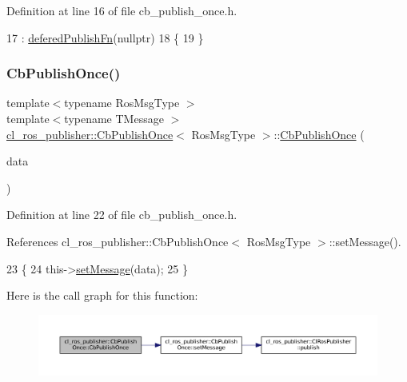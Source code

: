 Definition at line 16 of file cb\+\_\+publish\+\_\+once.\+h.


\begin{DoxyCode}
17         : \hyperlink{classcl__ros__publisher_1_1CbPublishOnce_a6222a91fb87cd3118ca9f84ff857c696}{deferedPublishFn}(\textcolor{keyword}{nullptr})
18     \{
19     \}
\end{DoxyCode}
\mbox{\label{classcl__ros__publisher_1_1CbPublishOnce_a54d9062c233e9949ec45c27da69cf83d}} 
\subsubsection{\texorpdfstring{Cb\+Publish\+Once()}{CbPublishOnce()}\hspace{0.1cm}{\footnotesize\ttfamily [2/2]}}
{\footnotesize\ttfamily template$<$typename Ros\+Msg\+Type $>$ \\
template$<$typename T\+Message $>$ \\
\hyperlink{classcl__ros__publisher_1_1CbPublishOnce}{cl\+\_\+ros\+\_\+publisher\+::\+Cb\+Publish\+Once}$<$ Ros\+Msg\+Type $>$\+::\hyperlink{classcl__ros__publisher_1_1CbPublishOnce}{Cb\+Publish\+Once} (\begin{DoxyParamCaption}\item[{const T\+Message \&}]{data }\end{DoxyParamCaption})\hspace{0.3cm}{\ttfamily [inline]}}



Definition at line 22 of file cb\+\_\+publish\+\_\+once.\+h.



References cl\+\_\+ros\+\_\+publisher\+::\+Cb\+Publish\+Once$<$ Ros\+Msg\+Type $>$\+::set\+Message().


\begin{DoxyCode}
23     \{
24         this->\hyperlink{classcl__ros__publisher_1_1CbPublishOnce_aedf3cb7940951d76773f46c807f34a58}{setMessage}(data);
25     \}
\end{DoxyCode}
Here is the call graph for this function\+:
\nopagebreak
\begin{figure}[H]
\begin{center}
\leavevmode
\includegraphics[width=350pt]{classcl__ros__publisher_1_1CbPublishOnce_a54d9062c233e9949ec45c27da69cf83d_cgraph}
\end{center}
\end{figure}



